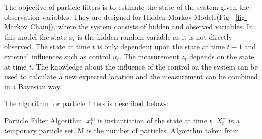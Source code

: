 \documentclass[12pt]{dalcsthesis}
\begin{document}
The objective of particle filters is to estimate the state of the system given the observation variables. They are designed for Hidden Markov Models(Fig ~\ref{fig-Markov Chain}), where the system consists of hidden and observed variables. In this model the state $x_{t}$ is the hidden random variable as it is not directly observed. The state at time $t$ is only dependent upon the state at time $t-1$ and external influences such as control $u_{t}$. The measurement $z_{t}$ depends on the state at time $t$. The knowledge about the influence of the control on the system can be used to calculate a new expected location and the measurement can be combined in a Bayesian way.

The algorithm for particle filters is described below-:

\begin{algorithm}[H]
\label{alg:ParticleFilter}
 \SetAlgoLined
  		 


\caption{Particle Filter Algorithm. $x_{t}^{m}$ is instantiation of the state at time $t$. $X_{t}^{-}$ is a temporary particle set. M is the number of particles. Algorithm taken from \cite{thrun2005probabilistic}}
\end{algorithm}
\end{document}
